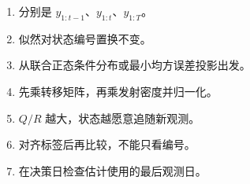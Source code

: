 \begin{enumerate}[leftmargin=*]
  \item 分别是 $y_{1:t-1}$、$y_{1:t}$、$y_{1:T}$。
  \item 似然对状态编号置换不变。
  \item 从联合正态条件分布或最小均方误差投影出发。
  \item 先乘转移矩阵，再乘发射密度并归一化。
  \item $Q/R$ 越大，状态越愿意追随新观测。
  \item 对齐标签后再比较，不能只看编号。
  \item 在决策日检查估计使用的最后观测日。
\end{enumerate}
